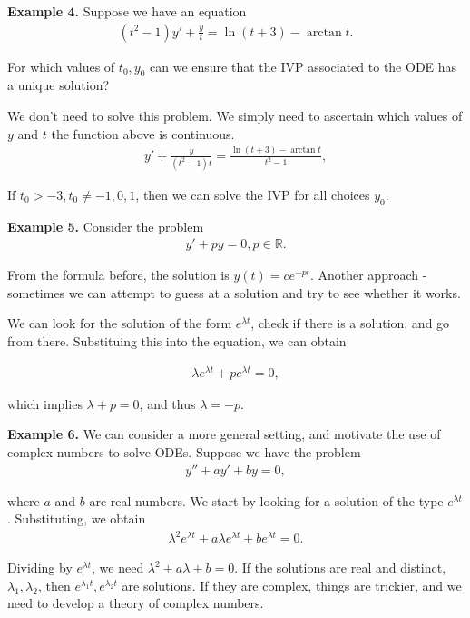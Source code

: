 \documentclass{article}
\begin{document}
{\bf Example 4.} Suppose we have an equation
\begin{align*}
  (t^2 - 1) y' + \frac{y}{t} = \ln (t+3) - \arctan t.
\end{align*}

For which values of $t_0, y_0$ can we ensure that the IVP associated to the ODE has a unique solution?

We don't need to solve this problem.  We simply need to ascertain which values of $y$ and $t$ the function above is continuous.
\begin{align*}
  y' + \frac{y}{(t^2-1)t} = \frac{\ln(t+3) - \arctan t}{t^2-1},
\end{align*}

If $t_0 > -3, t_0 \neq -1, 0, 1$, then we can solve the IVP for all choices $y_0$.

{\bf Example 5.} Consider the problem
\begin{align*}
  y' + py = 0, p \in \mathbb{R}.
\end{align*}

From the formula before, the solution is $y(t) = c e^{-pt}$.  Another approach - sometimes we can attempt to guess at a solution and try to see whether it works.

We can look for the solution of the form $e^{\lambda t}$, check if there is a solution, and go from there. Substituing this into the equation, we can obtain

\begin{align*}
  \lambda e^{\lambda t} + p e^{\lambda t} = 0,
\end{align*}

which implies $\lambda + p = 0$, and thus $\lambda = -p$.

{\bf Example 6.} We can consider a more general setting, and motivate the use of complex numbers to solve ODEs.  Suppose we have the problem
\begin{align*}
  y'' + a y' + by = 0,
\end{align*}

where $a$ and $b$ are real numbers. We start by looking for a solution of the type $e^{\lambda t}$.  Substituting, we obtain
\begin{align*}
  \lambda^2 e^{\lambda t} + a \lambda e^{\lambda t} + b e^{\lambda t} = 0.
\end{align*}

Dividing by $e^{\lambda t}$, we need $\lambda^2 + a\lambda + b = 0$. If the solutions are real and distinct, $\lambda_1, \lambda_2$, then $e^{\lambda_1 t}, e^{\lambda_2 t}$ are solutions.  If they are complex, things are trickier, and we need to develop a theory of complex numbers.
\end{document}
